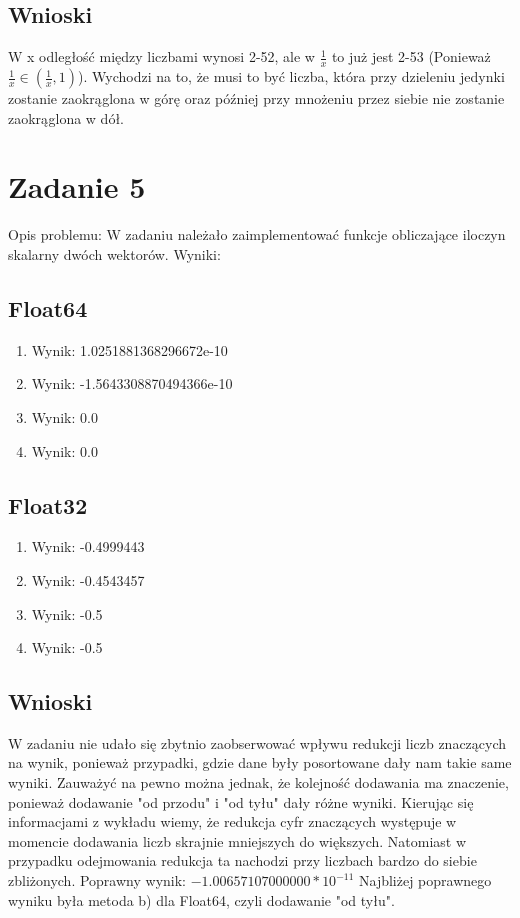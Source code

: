 \documentclass{article}
\begin{document}
\subsection{Wnioski}
W x odległość między liczbami wynosi 2-52, ale w $\frac{1}{x}$ to już jest 2-53 (Ponieważ $\frac{1}{x} \in (\frac{1}{x},1)$). Wychodzi na to, że musi to być liczba, która przy dzieleniu jedynki zostanie zaokrąglona w górę oraz później przy mnożeniu przez siebie nie zostanie zaokrąglona w dół.
\section{Zadanie 5}
Opis problemu: \newline
W zadaniu należało zaimplementować funkcje obliczające iloczyn skalarny dwóch wektorów.\newline\newline
Wyniki:
\subsection{Float64}
\begin{enumerate}
    \renewcommand{\labelenumi}{\alph{enumi})}
    \item Wynik: 1.0251881368296672e-10
    \item Wynik: -1.5643308870494366e-10
    \item Wynik: 0.0
    \item Wynik: 0.0
\end{enumerate}
\subsection{Float32}
\begin{enumerate}
    \renewcommand{\labelenumi}{\alph{enumi})}
    \item Wynik: -0.4999443
    \item Wynik: -0.4543457
    \item Wynik: -0.5
    \item Wynik: -0.5
\end{enumerate}
\subsection{Wnioski}
W zadaniu nie udało się zbytnio zaobserwować wpływu redukcji liczb znaczących na wynik, ponieważ przypadki, gdzie dane były posortowane dały nam takie same wyniki. Zauważyć na pewno można jednak, że kolejność dodawania ma znaczenie, ponieważ dodawanie "od przodu" i "od tyłu" dały różne wyniki. Kierując się informacjami z wykładu wiemy, że redukcja cyfr znaczących występuje w momencie dodawania liczb skrajnie mniejszych do większych. Natomiast w przypadku odejmowania redukcja ta nachodzi przy liczbach bardzo do siebie zbliżonych.\newline
Poprawny wynik: $-1.00657107000000*10^{-11}$\newline
Najbliżej poprawnego wyniku była metoda b) dla Float64, czyli dodawanie "od tyłu".
\end{document}
